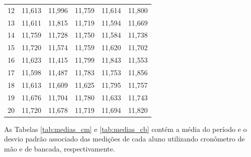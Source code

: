 \documentclass[12pt, a4paper, brazil]{article}
\begin{document}
\begin{table}[H]
\begin{tabular}{c c c c c c}
		12            & 11,613                    & 11,996                    & 11,759                    & 11,614                      & 11,800                    \\
		13            & 11,611                    & 11,815                    & 11,719                    & 11,594                      & 11,669                    \\
		14            & 11,759                    & 11,728                    & 11,750                    & 11,584                      & 11,738                    \\
		15            & 11,720                    & 11,574                    & 11,759                    & 11,620                      & 11,702                    \\
		16            & 11,623                    & 11,415                    & 11,799                    & 11,843                      & 11,553                    \\
		17            & 11,598                    & 11,487                    & 11,783                    & 11,753                      & 11,856                    \\
		18            & 11,613                    & 11,609                    & 11,625                    & 11,795                      & 11,757                    \\
		19            & 11,676                    & 11,704                    & 11,780                    & 11,633                      & 11,743                    \\
		20            & 11,720                    & 11,678                    & 11,719                    & 11,694                      & 11,820                    \\
		\hline
	\end{tabular}
	\label{tab:medições_cb}
\end{table}

As Tabelas \ref{tab:medias_cm} e \ref{tab:medias_cb}
contém a média do período e o desvio padrão associado das medições de cada aluno utilizando cronômetro de mão e de bancada, respectivamente.
\end{document}
